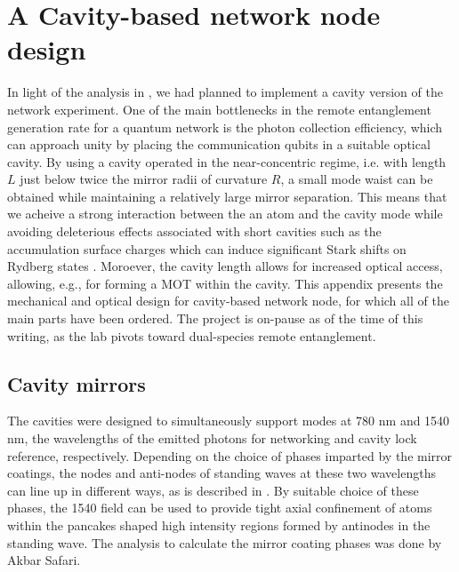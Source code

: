\chapter{A Cavity-based network node design}\label{ch:cavitynode}

In light of the analysis in \cite{Young2022}, we had planned to implement a cavity version of the network experiment. One of the main bottlenecks in the remote entanglement generation rate for a quantum network is the photon collection efficiency, which can approach unity by placing the communication qubits in a suitable optical cavity. By using a cavity operated in the near-concentric regime, i.e. with length $L$ just below twice the mirror radii of curvature $R$, a small mode waist can be obtained while maintaining a relatively large mirror separation. This means that we acheive a strong interaction between the an atom and the cavity mode while avoiding deleterious effects associated with short cavities such as the accumulation surface charges which can induce significant Stark shifts on Rydberg states \cite{Bohorquez2023}. Moroever, the cavity length allows for increased optical access, allowing, e.g., for forming a MOT within the cavity. This appendix presents the mechanical and optical design for cavity-based network node, for which all of the main parts have been ordered. The project is on-pause as of the time of this writing, as the lab pivots toward dual-species remote entanglement.

\section{Cavity mirrors}\label{sec:cavmirrors}

The cavities were designed to simultaneously support modes at 780 nm and 1540 nm, the wavelengths of the emitted photons for networking and cavity lock reference, respectively. Depending on the choice of phases imparted by the mirror coatings, the nodes and anti-nodes of standing waves at these two wavelengths can line up in different ways, as is described in \cite{garcia2020overlapping}. By suitable choice of these phases, the 1540 field can be used to provide tight axial confinement of atoms within the pancakes shaped high intensity regions formed by antinodes in the standing wave. The analysis to calculate the mirror coating phases was done by Akbar Safari.

